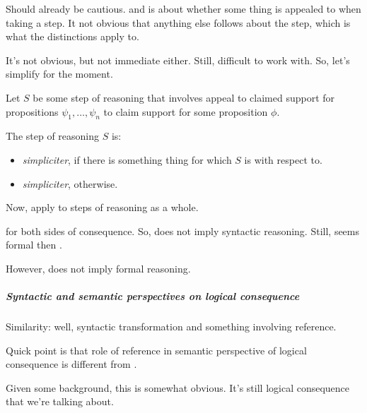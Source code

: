 \begin{note}
  Should already be cautious.
  \ur{} and \nr{} is about whether some thing is appealed to when taking a step.
  It not obvious that anything else follows about the step, which is what the distinctions apply to.

  It's not obvious, but not immediate either.
  Still, difficult to work with.
  So, let's simplify for the moment.

  \begin{definition}
    Let \(S\) be some step of reasoning that involves appeal to claimed support for propositions \(\psi_{1},\dots,\psi_{n}\) to claim support for some proposition \(\phi\).

    The step of reasoning \(S\) is:
    \begin{itemize}
    \item \ur{} \emph{simpliciter}, if there is something thing for which \(S\) is \ur{} with respect to.
    \item \nr{} \emph{simpliciter}, otherwise.
    \end{itemize}
    \vspace{-\baselineskip}
  \end{definition}
  Now, apply to steps of reasoning as a whole.
\end{note}

\begin{note}[Issues]
  \nr{} for both sides of consequence.
  So, \nr{} does not imply syntactic reasoning.
  Still, seems formal then \nr{}.

  However, \nr{} does not imply formal reasoning.
\end{note}

\subparagraph*{Syntactic and semantic perspectives on logical consequence}

\begin{note}
  Similarity: well, syntactic transformation and something involving reference.

  Quick point is that role of reference in semantic perspective of logical consequence is different from \ur{}.

  Given some background, this is somewhat obvious.
  It's still logical consequence that we're talking about.
\end{note}


